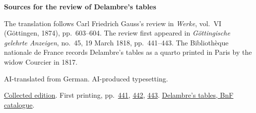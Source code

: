 \clearpage\thispagestyle{empty}
\begin{center}\Large\bfseries Sources for the review of Delambre’s tables\end{center}

The translation follows Carl Friedrich Gauss’s review in \emph{Werke}, vol.~VI (Göttingen, 1874), pp.~603--604. The review first appeared in \emph{Göttingische gelehrte Anzeigen}, no.~45, 19 March 1818, pp.~441--443. The Bibliothèque nationale de France records Delambre’s tables as a quarto printed in Paris by the widow Courcier in 1817.

AI-translated from German. AI-produced typesetting.

\href{https://gdz.sub.uni-goettingen.de/id/PPN236007467}{Collected edition}. First printing, pp.~\href{https://images.p.sub.uni-goettingen.de/iiif/image/gdz:PPN319721507_1818:00000447/full/1650,/0/default.jpg}{441}, \href{https://images.p.sub.uni-goettingen.de/iiif/image/gdz:PPN319721507_1818:00000448/full/1650,/0/default.jpg}{442}, \href{https://images.p.sub.uni-goettingen.de/iiif/image/gdz:PPN319721507_1818:00000449/full/1650,/0/default.jpg}{443}. \href{https://catalogue.bnf.fr/ark:/12148/cb30313540f}{Delambre’s tables, BnF catalogue}.

\clearpage
